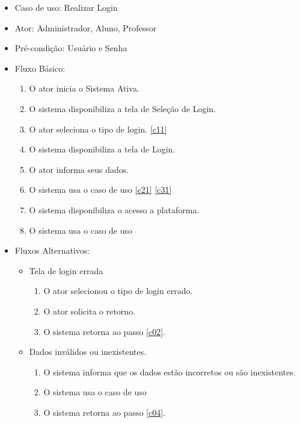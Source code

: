 \documentclass{utfpr-pg}
\begin{document}
    \begin{itemize}
        \item Caso de uso: Realizar Login
        \item Ator: Administrador, Aluno, Professor
        \item Pré-condição: Usuário e Senha
        \item Fluxo Básico:
        \begin{enumerate}[label=\textbf{C0.\arabic*}]
            \item O ator inicia o Sistema Ativa.
            \item \label{c02}O sistema disponibiliza a tela de Seleção de Login.
            \item O ator seleciona o tipo de login. \ref{c11}
            \item \label{c04}O sistema disponibiliza a tela de Login.
            \item O ator informa seus dados.
            \item O sistema usa o caso de uso \textbf{\textit{}} \ref{c21} \ref{c31} 
            \item O sistema disponibiliza o acesso a plataforma.
            \item O sistema usa o caso de uso \textbf{\textit{}}
        \end{enumerate}
        
        \item Fluxos Alternativos:
        \begin{itemize}
            \item Tela de login errada 
            \begin{enumerate}[label=\textbf{C1.\arabic*}]
                \item \label{c11} O ator selecionou o tipo de login errado.
                \item O ator solicita o retorno.
                \item O sistema retorna ao passo \ref{c02}.
            \end{enumerate}
            
            \item Dados inválidos ou inexistentes.
            \begin{enumerate}[label=\textbf{C2.\arabic*}]
                \item \label{c21} O sistema informa que os dados estão incorretos ou  são inexistentes.
                \item O sistema usa o caso de uso \textbf{\textit{}}
                \item O sistema retorna ao passo \ref{c04}.
            \end{enumerate}
            

\end{itemize}
\end{itemize}
\end{document}
